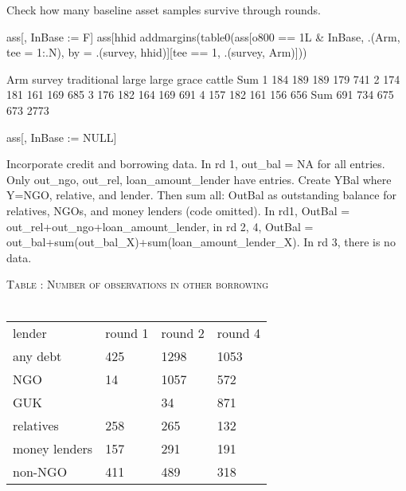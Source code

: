 Check how many baseline asset samples survive through rounds.
\begin{Schunk}
\begin{Sinput}
ass[, InBase := F]
ass[hhid %in% hhid[survey == 1], InBase := T]
addmargins(table0(ass[o800 == 1L & InBase, .(Arm, tee = 1:.N), 
  by = .(survey, hhid)][tee == 1, .(survey, Arm)]))
\end{Sinput}
\begin{Soutput}
      Arm
survey traditional large large grace cattle  Sum
   1           184   189         189    179  741
   2           174   181         161    169  685
   3           176   182         164    169  691
   4           157   182         161    156  656
   Sum         691   734         675    673 2773
\end{Soutput}
\begin{Sinput}
ass[, InBase := NULL]
\end{Sinput}
\end{Schunk}


Incorporate credit and borrowing data. In rd 1, \textsf{out\_bal} = NA for all entries. Only \textsf{out\_ngo}, \textsf{out\_rel}, \textsf{loan\_amount\_lender} have entries. Create \textsf{YBal} where \textsf{Y=}NGO, relative, and lender. Then sum all: \textsf{OutBal} as outstanding balance for relatives, NGOs, and money lenders  (code omitted). In rd1, \textsf{OutBal} = \textsf{out\_rel}+\textsf{out\_ngo}+\textsf{loan\_amount\_lender}, in rd 2, 4, \textsf{OutBal} = \textsf{out\_bal}+\textsf{sum(out\_bal\_X)}+\textsf{sum(loan\_amount\_lender\_X)}. In rd 3, there is no data. 


\hfil\textsc{\footnotesize Table \thetable: Number of observations in other borrowing\label{tab other borrowing num obs}}\\
\hfil \\
\hfil\begin{tabular}{
>{\footnotesize\hfill}p{2cm}<{}
>{\footnotesize\hfil}p{1cm}<{}>{\footnotesize\hfil}p{1cm}<{}>{\footnotesize\hfil}p{1cm}<{}
}
\rowcolor{paleblue}
lender & round 1 & round 2 & round 4\\
any debt & 425&1298&1053\\
\rowcolor{gray90}
NGO & 14&1057&572\\
GUK & &34&871\\
\rowcolor{gray90}
relatives & 258&265&132\\
money lenders & 157&291&191\\
\rowcolor{gray90}
non-NGO & 411&489&318
\end{tabular}


